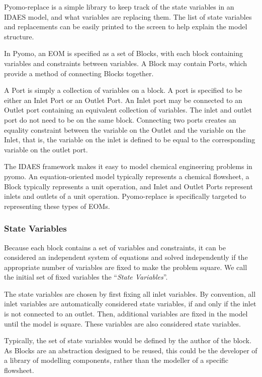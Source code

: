 Pyomo-replace is a simple library to keep track of the state variables
in an IDAES model, and what variables are replacing them. The list of
state variables and replacements can be easily printed to the screen to
help explain the model structure.

In Pyomo, an EOM is specified as a set of Blocks, with each block
containing variables and constraints between variables. A Block may
contain Ports, which provide a method of connecting Blocks together.

A Port is simply a collection of variables on a block. A port is
specified to be either an Inlet Port or an Outlet Port. An Inlet port
may be connected to an Outlet port containing an equivalent collection
of variables. The inlet and outlet port do not need to be on the same
block. Connecting two ports creates an equality constraint between the
variable on the Outlet and the variable on the Inlet, that is, the
variable on the inlet is defined to be equal to the corresponding
variable on the outlet port.

The IDAES framework makes it easy to model chemical engineering problems
in pyomo. An equation-oriented model typically represents a chemical
flowsheet, a Block typically represents a unit operation, and Inlet and
Outlet Ports represent inlets and outlets of a unit operation.
Pyomo-replace is specifically targeted to representing these types of
EOMs.

\hypertarget{state-variables}{%
\subsubsection{State Variables}\label{state-variables}}

Because each block contains a set of variables and constraints, it can
be considered an independent system of equations and solved
independently if the appropriate number of variables are fixed to make
the problem square. We call the initial set of fixed variables the
``\emph{State Variables}''.

The state variables are chosen by first fixing all inlet variables. By
convention, all inlet variables are automatically considered state
variables, if and only if the inlet is not connected to an outlet. Then,
additional variables are fixed in the model until the model is square.
These variables are also considered state variables.

Typically, the set of state variables would be defined by the author of
the block. As Blocks are an abstraction designed to be reused, this
could be the developer of a library of modelling components, rather than
the modeller of a specific flowsheet.


